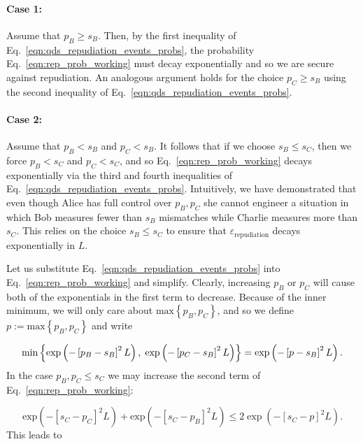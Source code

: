 \paragraph{Case 1:} Assume that $p_B \ge s_B$. Then, by the first inequality of Eq.~\ref{eqn:qds_repudiation_events_probs}, the probability Eq.~\ref{eqn:rep_prob_working} must decay exponentially %
and so we are secure against repudiation. An analogous argument holds for the choice $p_C \ge s_B$ using the second inequality of Eq.~\ref{eqn:qds_repudiation_events_probs}.

\paragraph{Case 2:} Assume that $p_B < s_B$ and $p_C < s_B$. It follows that if we choose $s_B \le s_C$, then we force $p_B < s_C$ and $p_C < s_C$, and so Eq.~\ref{eqn:rep_prob_working} decays exponentially via the third and fourth inequalities of Eq.~\ref{eqn:qds_repudiation_events_probs}. Intuitively, we have demonstrated that even though Alice has full control over $p_B, p_C$ she cannot engineer a situation in which Bob measures fewer than $s_B$ mismatches while Charlie measures more than $s_C$. This relies on the choice $s_B \le s_C$ to ensure that $\varepsilon_{\text{repudiation}}$ decays exponentially in $L$.


Let us substitute Eq.~\ref{eqn:qds_repudiation_events_probs} into Eq.~\ref{eqn:rep_prob_working} and simplify. Clearly, increasing $p_B$ or $p_C$ will cause both of the exponentials in the first term to decrease. Because of the inner minimum, we will only care about $\text{max}\left\{p_B, p_C\right\}$, and so we define $p := \text{max}\left\{p_B, p_C\right\}$ and write

\begin{equation}
\text{min}\left\{\text{exp}\left(- \left[p_B - s_B\right]^2L\right), \; \text{exp}\left(- \left[p_C - s_B\right]^2L\right)\right\} = \text{exp}\left(-\left[p - s_B\right]^2L\right). \notag
\end{equation}
In the case $p_B, p_C \le s_C$ we may increase the second term of Eq.~\ref{eqn:rep_prob_working}:

\begin{equation}
\text{exp}\left(- \left[s_C - p_C\right]^2 L \right) + \text{exp}\left(- \left[s_C - p_B\right]^2 L \right) \le 2 \exp\left( - \left[s_C - p\right]^2 L\right).
\end{equation}
This leads to

